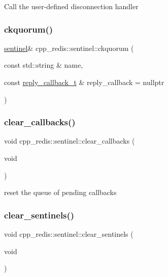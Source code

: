 Call the user-\/defined disconnection handler \mbox{\label{classcpp__redis_1_1sentinel_aaed03955e468d9f7c3df37376ecafc3a}} 
\subsubsection{\texorpdfstring{ckquorum()}{ckquorum()}}
{\footnotesize\ttfamily \hyperlink{classcpp__redis_1_1sentinel}{sentinel}\& cpp\+\_\+redis\+::sentinel\+::ckquorum (\begin{DoxyParamCaption}\item[{const std\+::string \&}]{name,  }\item[{const \hyperlink{classcpp__redis_1_1sentinel_ae1a150ff8787208c47414397a061c9a7}{reply\+\_\+callback\+\_\+t} \&}]{reply\+\_\+callback = {\ttfamily nullptr} }\end{DoxyParamCaption})}

\mbox{\label{classcpp__redis_1_1sentinel_a4f5364cf618fefe34ced591d698f5caf}} 
\subsubsection{\texorpdfstring{clear\+\_\+callbacks()}{clear\_callbacks()}}
{\footnotesize\ttfamily void cpp\+\_\+redis\+::sentinel\+::clear\+\_\+callbacks (\begin{DoxyParamCaption}\item[{void}]{ }\end{DoxyParamCaption})\hspace{0.3cm}{\ttfamily [private]}}

reset the queue of pending callbacks \mbox{\label{classcpp__redis_1_1sentinel_ac36640b3f392970c72f5a513a2d61ac7}} 
\subsubsection{\texorpdfstring{clear\+\_\+sentinels()}{clear\_sentinels()}}
{\footnotesize\ttfamily void cpp\+\_\+redis\+::sentinel\+::clear\+\_\+sentinels (\begin{DoxyParamCaption}\item[{void}]{ }\end{DoxyParamCaption})}

